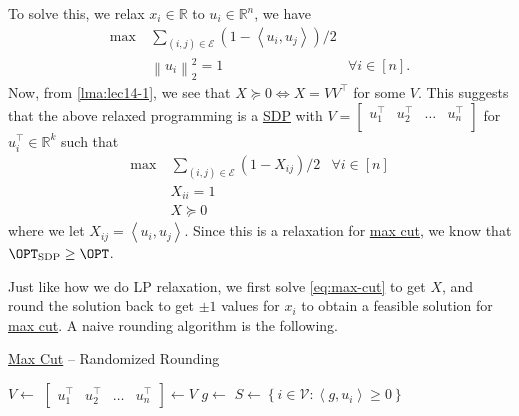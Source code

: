 To solve this, we relax \(x_i\in \mathbb{R} \) to \(u_i\in \mathbb{R} ^n\), we have
\[
	\begin{aligned}
		\max~ & \sum_{(i, j)\in \mathcal{E}} ( 1 - \left\langle u_i, u_j \right\rangle ) / 2                     \\
		      & \left\lVert u_i\right\rVert _2 ^{2} = 1                                      & \forall i\in [n].
	\end{aligned}
\]
Now, from \autoref{lma:lec14-1}, we see that \(X \succeq 0 \iff X = V V^{\top} \) for some \(V\). This suggests that the above relaxed programming is a \hyperref[def:SDP]{SDP} with \(V = \begin{bmatrix}
	u_1 ^{\top} & u_2 ^{\top} & \dots & u_n ^{\top} \\
\end{bmatrix}\) for \(u_i ^{\top} \in \mathbb{R} ^k\) such that
\begin{equation}\label{eq:max-cut}
	\begin{aligned}
		\max~ & \sum_{(i, j)\in \mathcal{E}} ( 1 - X_{ij} ) / 2 & \forall i\in [n] \\
		      & X_{ii} = 1                                                         \\
		      & X \succeq 0
	\end{aligned}
\end{equation}
where we let \(X_{ij} = \left\langle u_i, u_j \right\rangle \). Since this is a relaxation for \hyperref[prb:max-cut]{max cut}, we know that \(\OPT_{\mathrm{SDP} } \geq \OPT\).

Just like how we do LP relaxation, we first solve \autoref{eq:max-cut} to get \(X\), and round the solution back to get \(\pm 1\) values for \(x_i\) to obtain a feasible solution for \hyperref[prb:max-cut]{max cut}. A naive rounding algorithm is the following.

\begin{algorithm}[H]\label{algo:max-cut-randomized-rounding}
	\DontPrintSemicolon
	\caption{\hyperref[prb:max-cut]{Max Cut} -- Randomized Rounding}
	\BlankLine
	\(V\gets\)
	\(\begin{bmatrix}u_1 ^{\top} & u_2 ^{\top} & \dots & u_n ^{\top}\end{bmatrix}\gets V\)\;
	\(g\gets\)
	\(S\gets \left\{ i\in \mathcal{V} \colon \left\langle g, u_i \right\rangle \geq 0 \right\} \)
	\;
\end{algorithm}

